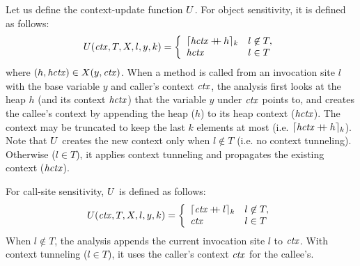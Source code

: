 %

Let us define the context-update function $U$. 
For object sensitivity, it is defined as follows: 
\begin{equation}\label{eq:objsens}
\begin{array}{rr}
U ({\it ctx}, T, X, l, y, k) =
\left\{
\begin{array}{ll}
{\lceil {\it hctx} \mathbin{{+}\mspace{-8mu}{+}} h \rceil_{k}} & l \not\in T, \\
{\it hctx} & l \in T
\end{array}
\right.\\
\end{array}
\end{equation}
where $(h, {\it hctx}) \in X(y, {\it ctx})$.
When a method is called from an
      invocation site $l$ with the base variable $y$ and caller's
      context ${\it ctx}$, the analysis first looks at the heap $h$ (and
      its context ${\it hctx}$) that the variable $y$ under ${\it ctx}$ points
      to, and creates the callee's context by appending the heap ($h$)
      to its heap context (${\it hctx}$). The context may be truncated to
      keep the last $k$ elements at most (i.e.
      ${\lceil {\it hctx} \mathbin{{+}\mspace{-8mu}{+}} h \rceil_{k}}$).
Note that 
$U$ creates the new context only when $l \not\in
T$ (i.e. no context tunneling). Otherwise ($l \in T$), it applies context tunneling and propagates the existing 
context (${\it hctx}$). 

%

For call-site sensitivity, $U$ is defined as follows: 
\begin{equation}\label{eq:cfa}
U({\it ctx}, T, X, l, y, k) =
    \left\{
      \begin{array}{ll}
        {\lceil {\it ctx} \mathbin{{+}\mspace{-8mu}{+}} l \rceil_{k}} & l \not\in T, \\
        {\it ctx} & l \in T
      \end{array}
    \right.
\end{equation}
When $l \not\in T$, 
the analysis appends 
the current invocation site $l$ to
${\it ctx}$. With context tunneling ($l \in T$), it uses the caller's context ${\it ctx}$ for the callee's. 



